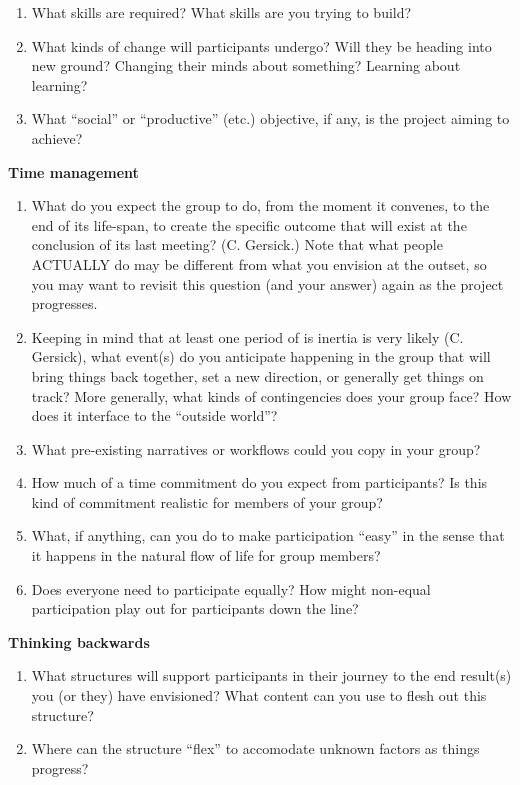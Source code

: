 \begin{enumerate}
\item
  What skills are required? What skills are you trying to build?
\item
  What kinds of change will participants undergo? Will they be heading
  into new ground? Changing their minds about something? Learning about
  learning?
\item
  What ``social'' or ``productive'' (etc.) objective, if any, is the
  project aiming to achieve?
\end{enumerate}

\textbf{Time management}

\begin{enumerate}
\item
  What do you expect the group to do, from the moment it convenes, to
  the end of its life-span, to create the specific outcome that will
  exist at the conclusion of its last meeting? (C. Gersick.) Note that
  what people ACTUALLY do may be different from what you envision at the
  outset, so you may want to revisit this question (and your answer)
  again as the project progresses.
\item
  Keeping in mind that at least one period of is inertia is very likely
  (C. Gersick), what event(s) do you anticipate happening in the group
  that will bring things back together, set a new direction, or
  generally get things on track? More generally, what kinds of
  contingencies does your group face? How does it interface to the
  ``outside world''?
\item
  What pre-existing narratives or workflows could you copy in your
  group?
\item
  How much of a time commitment do you expect from participants? Is this
  kind of commitment realistic for members of your group?
\item
  What, if anything, can you do to make participation ``easy'' in the
  sense that it happens in the natural flow of life for group members?
\item
  Does everyone need to participate equally? How might non-equal
  participation play out for participants down the line?
\end{enumerate}

\textbf{Thinking backwards}

\begin{enumerate}
\item
  What structures will support participants in their journey to the end
  result(s) you (or they) have envisioned? What content can you use to
  flesh out this structure?
\item
  Where can the structure ``flex'' to accomodate unknown factors as
  things progress?\textbf{}
\end{enumerate}

